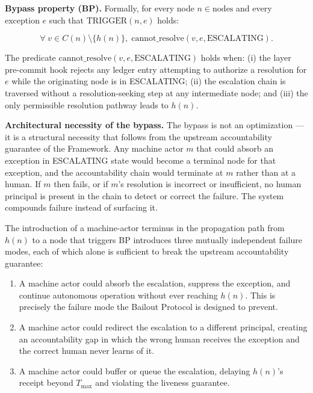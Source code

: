 \bigskip
\noindent\textbf{Bypass property (BP).} Formally, for every node $n \in \text{nodes}$ and every exception $e$ such that $\text{TRIGGER}(n, e)$ holds:

\begin{equation}
\forall\; v \in C(n) \setminus \{h(n)\},\; \text{cannot\_resolve}(v, e, \text{ESCALATING}). \tag{BP}
\end{equation}

The predicate $\text{cannot\_resolve}(v, e, \text{ESCALATING})$ holds when: (i) the \fact{} layer pre-commit hook rejects any ledger entry attempting to authorize a resolution for $e$ while the originating node is in ESCALATING; (ii) the escalation chain is traversed without a resolution-seeking step at any intermediate node; and (iii) the only permissible resolution pathway leads to $h(n)$.

\bigskip
\noindent\textbf{Architectural necessity of the bypass.} The bypass is not an optimization — it is a structural necessity that follows from the upstream accountability guarantee of the \bxthree{} Framework. Any machine actor $m$ that could absorb an exception in ESCALATING state would become a terminal node for that exception, and the accountability chain would terminate at $m$ rather than at a human. If $m$ then fails, or if $m$'s resolution is incorrect or insufficient, no human principal is present in the chain to detect or correct the failure. The system compounds failure instead of surfacing it.

The introduction of a machine-actor terminus in the propagation path from $h(n)$ to a node that triggers BP introduces three mutually independent failure modes, each of which alone is sufficient to break the upstream accountability guarantee:

\begin{enumerate}
\item[\textbf{Intercept.}] A machine actor could absorb the escalation, suppress the exception, and continue autonomous operation without ever reaching $h(n)$. This is precisely the failure mode the Bailout Protocol is designed to prevent.

\item[\textbf{Redirect.}] A machine actor could redirect the escalation to a different principal, creating an accountability gap in which the wrong human receives the exception and the correct human never learns of it.

\item[\textbf{Delay.}] A machine actor could buffer or queue the escalation, delaying $h(n)$'s receipt beyond $T_{\text{max}}$ and violating the liveness guarantee.
\end{enumerate}

